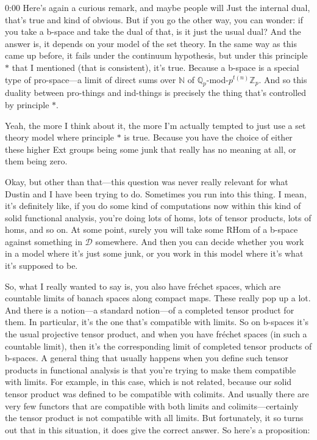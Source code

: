 \begin{unfinished}{0:00}
Here's again a curious remark, and maybe people will
Just the internal dual, that's true and kind of obvious. But if you go the other way, you can wonder: if you take a b-space and take the dual of that, is it just the usual dual? And the answer is, it depends on your model of the set theory. In the same way as this came up before, it fails under the continuum hypothesis, but under this principle $*$ that I mentioned (that is consistent), it's true. Because a b-space is a special type of pro-space---a limit of direct sums over $\mathbb{N}$ of $\mathbb{Q}_p$-mod-$p^{t(n)} \mathbb{Z}_p$. And so this duality between pro-things and ind-things is precisely the thing that's controlled by principle $*$.

Yeah, the more I think about it, the more I'm actually tempted to just use a set theory model where principle $*$ is true. Because you have the choice of either these higher Ext groups being some junk that really has no meaning at all, or them being zero.

Okay, but other than that---this question was never really relevant for what Dustin and I have been trying to do. Sometimes you run into this thing. I mean, it's definitely like, if you do some kind of computations now within this kind of solid functional analysis, you're doing lots of homs, lots of tensor products, lots of homs, and so on. At some point, surely you will take some RHom of a b-space against something in $\mathcal{D}$ somewhere. And then you can decide whether you work in a model where it's just some junk, or you work in this model where it's what it's supposed to be.

So, what I really wanted to say is, you also have fréchet spaces, which are countable limits of banach spaces along compact maps. These really pop up a lot. And there is a notion---a standard notion---of a completed tensor product for them. In particular, it's the one that's compatible with limits. So on b-spaces it's the usual projective tensor product, and when you have fréchet spaces (in such a countable limit), then it's the corresponding limit of completed tensor products of b-spaces. A general thing that usually happens when you define such tensor products in functional analysis is that you're trying to make them compatible with limits. For example, in this case, which is not related, because our solid tensor product was defined to be compatible with colimits. And usually there are very few functors that are compatible with both limits and colimits---certainly the tensor product is not compatible with all limits. But fortunately, it so turns out that in this situation, it does give the correct answer. So here's a proposition:


\end{unfinished}
